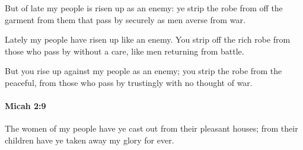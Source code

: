 			\begin{versebox}
					\item[BHS] 
					\item[LXX] 
					\item[ASV] But of late my people is risen up as an enemy: ye strip the robe from off the garment from them that pass by securely as men averse from war.
					\item[NIV] Lately my people have risen up like an enemy. You strip off the rich robe from those who pass by without a care, like men returning from battle.
					\item[NRSV] But you rise up against my people as an enemy; you strip the robe from the peaceful, from those who pass by trustingly with no thought of war.
			\end{versebox}

		\paragraph{Micah 2:9} %
			\label{MICAH-2-9}

			The women of my people have ye cast out from their pleasant houses; from their children have ye taken away my glory for ever.

